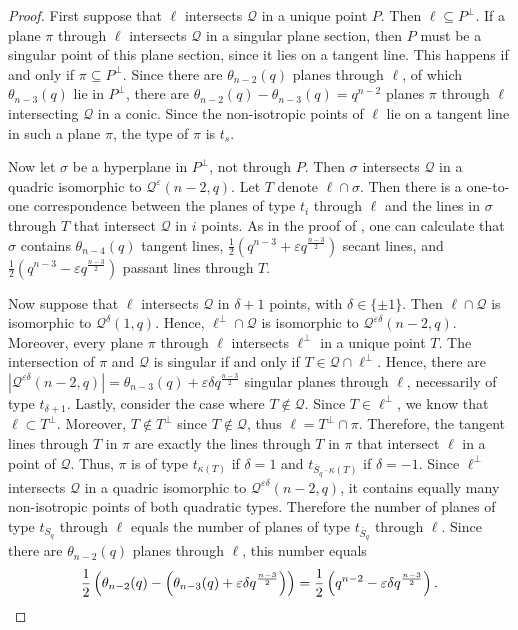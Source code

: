 \documentclass[a4paper]{article}
\theoremstyle{definition}
\newcommand{\eps}{\varepsilon}
\newcommand{\mq}{\mathcal Q}
\newcommand{\ns}{\overline S}
\begin{document}
\begin{proof}
 First suppose that $\ell$ intersects $\mq$ in a unique point $P$.
 Then $\ell \subseteq P^\perp$.
 If a plane $\pi$ through $\ell$ intersects $\mq$ in a singular plane section, then $P$ must be a singular point of this plane section, since it lies on a tangent line.
 This happens if and only if $\pi \subseteq P^\perp$.
 Since there are $\theta_{n-2}(q)$ planes through $\ell$, of which $\theta_{n-3}(q)$ lie in $P^\perp$, there are $\theta_{n-2}(q)-\theta_{n-3}(q) = q^{n-2}$ planes $\pi$ through $\ell$ intersecting $\mq$ in a conic.
 Since the non-isotropic points of $\ell$ lie on a tangent line in such a plane $\pi$, the type of $\pi$ is $t_s$.
 
 Now let $\sigma$ be a hyperplane in $P^\perp$, not through $P$.
 Then $\sigma$ intersects $\mq$ in a quadric isomorphic to $\mq^\eps(n-2,q)$.
 Let $T$ denote $\ell \cap \sigma$.
 Then there is a one-to-one correspondence between the planes of type $t_i$ through $\ell$ and the lines in $\sigma$ through $T$ that intersect $\mq$ in $i$ points.
 As in the proof of , one can calculate that $\sigma$ contains $\theta_{n-4}(q)$ tangent lines, $\frac12 \left( q^{n-3} + \eps q^{\frac{n-3}2} \right)$ secant lines, and $\frac 12 \left( q^{n-3} - \eps q^{\frac{n-3}2} \right)$ passant lines through $T$.
 
 Now suppose that $\ell$ intersects $\mq$ in $\delta+1$ points, with $\delta \in \{\pm 1\}$.
 Then $\ell \cap \mq$ is isomorphic to $\mq^\delta(1,q)$.
 Hence, $\ell^\perp \cap \mq$ is isomorphic to $\mq^{\eps \delta}(n-2,q)$.
 Moreover, every plane $\pi$ through $\ell$ intersects $\ell^\perp$ in a unique point $T$.
 The intersection of $\pi$ and $\mq$ is singular if and only if $T \in \mq \cap \ell^\perp$.
 Hence, there are $|\mq^{\eps \delta}(n-2,q)| =\theta_{n-3}(q)+\eps\delta q^{\frac{n-3}{2}}$ singular planes through $\ell$, necessarily of type $t_{\delta+1}$. %
 Lastly, consider the case where $T \notin \mq$.
 Since $T \in \ell^\perp$, we know that $\ell \subset T^\perp$.
 Moreover, $T \notin T^\perp$ since $T \notin \mq$, thus $\ell = T^\perp \cap \pi$.
 Therefore, the tangent lines through $T$ in $\pi$ are exactly the lines through $T$ in $\pi$ that intersect $\ell$ in a point of $\mq$.
 Thus, $\pi$ is of type $t_{\kappa(T)}$ if $\delta=1$ and $t_{\ns_q \cdot \kappa(T)}$ if $\delta=-1$.
 Since $\ell^\perp$ intersects $\mq$ in a quadric isomorphic to $\mq^{\eps \delta}(n-2,q)$, it contains equally many non-isotropic points of both quadratic types.
 Therefore the number of planes of type $t_{S_q}$ through $\ell$ equals the number of planes of type $t_{\ns_q}$ through $\ell$.
 Since there are $\theta_{n-2}(q)$ planes through $\ell$, this number equals
 \[
  \frac12 \left( \theta_{n-2}(q) - \left( \theta_{n-3}(q)+\eps\delta q^{\frac{n-3}{2}}\right) \right) = \frac 12 \left( q^{n-2} - \eps \delta q^{\frac{n-3}2} \right). \qedhere
 \]
\end{proof}
\end{document}
